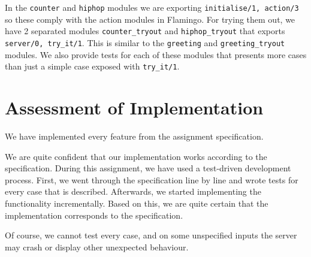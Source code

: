 \documentclass{article}
\begin{document}
	In the \texttt{counter} and \texttt{hiphop} modules we are exporting \texttt{initialise/1, action/3} so these comply with the action modules in Flamingo. For trying them out, we have 2 separated modules \texttt{counter\_tryout} and \texttt{hiphop\_tryout} that exports \texttt{server/0, try\_it/1}. This is similar to the \texttt{greeting} and \texttt{greeting\_tryout} modules. We also provide tests for each of these modules that presents more cases than just a simple case exposed with \texttt{try\_it/1}.
	
	\section{Assessment of Implementation}
	We have implemented every feature from the assignment specification.
	
	We are quite confident that our implementation works according to the specification. During this assignment, we have used a test-driven development process. First, we went through the specification line by line and wrote tests for every case that is described. Afterwards, we started implementing the functionality incrementally. Based on this, we are quite certain that the implementation corresponds to the specification.
	
	Of course, we cannot test every case, and on some unspecified inputs the server may crash or display other unexpected behaviour. 
	
\end{document}
